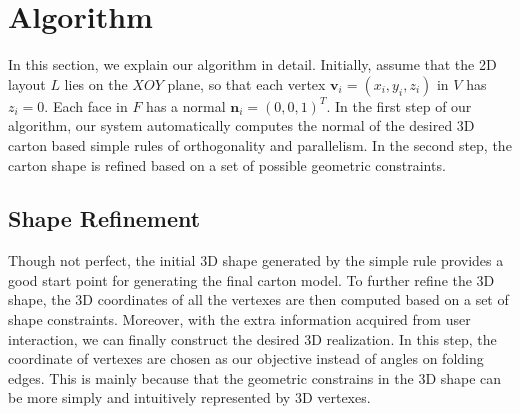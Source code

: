 \section{Algorithm}\label{sec:optimization}


In this section, we explain our algorithm in detail. 
Initially, assume that the 2D layout $L$ lies on the $XOY$ plane, so that each vertex $\mathbf{v}_i=(x_i,y_i,z_i)$ in $V$ has $z_i=0$. 
Each face in $F$ has a normal $\mathbf{n}_i=(0,0,1)^T$.
%
In the first step of our algorithm, our system automatically computes the normal of the desired 3D carton based simple rules of orthogonality and parallelism.
In the second step, the carton shape is refined based on a set of possible geometric constraints.




\subsection{Shape Refinement}

Though not perfect, the initial 3D shape generated by the simple rule provides a good start point for generating the final carton model. 
%
To further refine the 3D shape, the 3D coordinates of all the vertexes are then computed based on a set of shape constraints.
%
Moreover, with the extra information acquired from user interaction, we can finally construct the desired 3D realization.
In this step, the coordinate of vertexes are chosen as our objective instead of angles on folding edges.
This is mainly because that the geometric constrains in the 3D shape can be more simply and intuitively represented by 3D vertexes.
 


